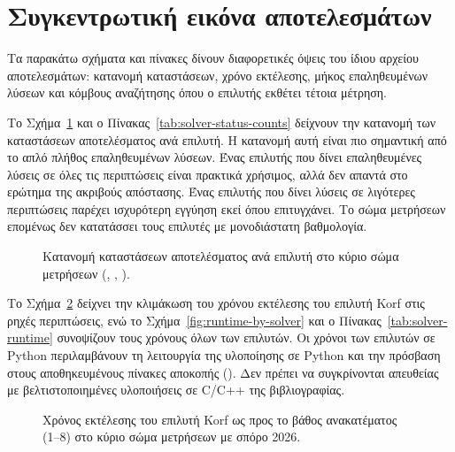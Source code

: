 \section{Συγκεντρωτική εικόνα αποτελεσμάτων}
\label{sec:experiments-overview}

Τα παρακάτω σχήματα και πίνακες δίνουν διαφορετικές όψεις του ίδιου αρχείου αποτελεσμάτων: κατανομή καταστάσεων, χρόνο εκτέλεσης, μήκος επαληθευμένων λύσεων και κόμβους αναζήτησης όπου ο επιλυτής εκθέτει τέτοια μέτρηση.

Το Σχήμα~\ref{fig:status-counts} και ο Πίνακας~\ref{tab:solver-status-counts} δείχνουν την κατανομή των καταστάσεων αποτελέσματος ανά επιλυτή. Η κατανομή αυτή είναι πιο σημαντική από το απλό πλήθος επαληθευμένων λύσεων. Ένας επιλυτής που δίνει επαληθευμένες  λύσεις σε όλες τις περιπτώσεις είναι πρακτικά χρήσιμος, αλλά δεν απαντά στο ερώτημα της ακριβούς απόστασης. Ένας επιλυτής που δίνει  λύσεις σε λιγότερες περιπτώσεις παρέχει ισχυρότερη εγγύηση εκεί όπου επιτυγχάνει. Το σώμα μετρήσεων επομένως δεν κατατάσσει τους επιλυτές με μονοδιάστατη βαθμολογία.

\begin{figure}[htbp]\centering

\caption[Κατανομή καταστάσεων αποτελέσματος ανά επιλυτή]{Κατανομή καταστάσεων αποτελέσματος ανά επιλυτή στο κύριο σώμα μετρήσεων (, , ).}
\label{fig:status-counts}
\end{figure}

\begin{table}[htbp]\centering

\caption[Πλήθη καταστάσεων αποτελέσματος ανά επιλυτή]{Πλήθη καταστάσεων αποτελέσματος ανά επιλυτή στο κύριο σώμα μετρήσεων. Πηγή: .}
\label{tab:solver-status-counts}
\end{table}

Το Σχήμα~\ref{fig:runtime-depth} δείχνει την κλιμάκωση του χρόνου εκτέλεσης του επιλυτή Korf στις ρηχές περιπτώσεις, ενώ το Σχήμα~\ref{fig:runtime-by-solver} και ο Πίνακας~\ref{tab:solver-runtime} συνοψίζουν τους χρόνους όλων των επιλυτών. Οι χρόνοι των επιλυτών σε Python περιλαμβάνουν τη λειτουργία της υλοποίησης σε Python και την πρόσβαση στους αποθηκευμένους πίνακες αποκοπής (). Δεν πρέπει να συγκρίνονται απευθείας με βελτιστοποιημένες υλοποιήσεις σε C/C++ της βιβλιογραφίας.

\begin{figure}[htbp]\centering

\caption[Χρόνος εκτέλεσης του επιλυτή Korf ως προς το βάθος ανακατέματος]{Χρόνος εκτέλεσης του επιλυτή Korf ως προς το βάθος ανακατέματος (1--8) στο κύριο σώμα μετρήσεων με σπόρο 2026.}
\label{fig:runtime-depth}
\end{figure}

